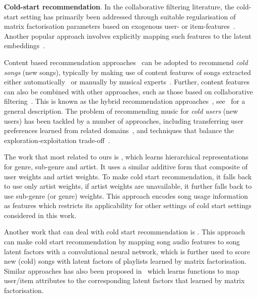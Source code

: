 {\bf Cold-start recommendation}.
In the collaborative filtering literature,
the cold-start setting has primarily been addressed through
suitable regularisation of matrix factorisation parameters
based on exogenous user- or item-features~\cite{Ma:2008,Agarwal:2009,Cao:2010}.
Another popular approach involves explicitly mapping such features to the latent embeddings~\cite{Gantner:2010}.

Content based recommendation approaches~\cite[Chapter~4]{aggarwal2016recommender}
can be adopted to recommend {\it cold songs} (\ie new songs),
typically by making use of content features of songs extracted either automatically~\cite{seyerlehner2010automatic,eghbal2015vectors}
or manually by musical experts~\cite{john2006pandora}.
Further, content features can also be combined with other approaches, such as those based on 
collaborative filtering~\cite{yoshii2006hybrid,donaldson2007hybrid,shao2009music}.
This is known as the hybrid recommendation approaches~\cite{burke2002hybrid}, 
see~\cite[Chapter~6]{aggarwal2016recommender} for a general description. %
The problem of recommending music for {\it cold users} (\ie new users) 
has been tackled by a number of approaches, including transferring user preferences learned 
from related domains~\cite{hu2010study,aizenberg2012build},
and techniques that balance the exploration-exploitation trade-off~\cite{wang2014exploration,liebman2015dj}.


The work that most related to ours is \citep{ben2017groove}, which learns hierarchical representations
for genre, sub-genre and artist.
It uses a similar additive form that composite of user weights and artist weights.
To make cold start recommendation, it falls back to use only artist weights,
if artist weights are unavailable, it further falls back to use sub-genre (or genre) weights.
This approach encodes song usage information as features which restricts its applicability for other settings
of cold start settings considered in this work.

Another work that can deal with cold start recommendation is \citep{van2013deep}.
This approach can make cold start recommendation by mapping song audio features to song latent factors 
with a convolutional neural network, which is further used to score new (cold) songs with 
latent factors of playlists learned by matrix factorisation.
Similar approaches has also been proposed in~\cite{gantner2010learning} which learns functions to map
user/item attributes to the corresponding latent factors that learned by matrix factorisation.




